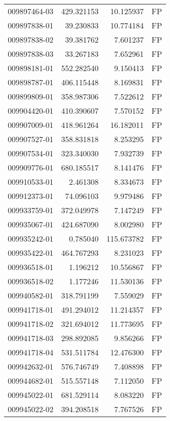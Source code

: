 \begin{tabular}{lrrl}
009897464-03 &  429.321153 &    10.125937 &   FP \\
009897838-01 &   39.230833 &    10.774184 &   FP \\
009897838-02 &   39.381762 &     7.601237 &   FP \\
009897838-03 &   33.267183 &     7.652961 &   FP \\
009898181-01 &  552.282540 &     9.150413 &   FP \\
009898787-01 &  406.115448 &     8.169831 &   FP \\
009899809-01 &  358.987306 &     7.522612 &   FP \\
009904420-01 &  410.390607 &     7.570152 &   FP \\
009907009-01 &  418.961264 &    16.182011 &   FP \\
009907527-01 &  358.831818 &     8.253295 &   FP \\
009907534-01 &  323.340030 &     7.932739 &   FP \\
009909776-01 &  680.185517 &     8.141476 &   FP \\
009910533-01 &    2.461308 &     8.334673 &   FP \\
009912373-01 &   74.096103 &     9.979486 &   FP \\
009933759-01 &  372.049978 &     7.147249 &   FP \\
009935067-01 &  424.687090 &     8.002980 &   FP \\
009935242-01 &    0.785040 &   115.673782 &   FP \\
009935422-01 &  464.767293 &     8.231023 &   FP \\
009936518-01 &    1.196212 &    10.556867 &   FP \\
009936518-02 &    1.177246 &    11.530136 &   FP \\
009940582-01 &  318.791199 &     7.559029 &   FP \\
009941718-01 &  491.294012 &    11.214357 &   FP \\
009941718-02 &  321.694012 &    11.773695 &   FP \\
009941718-03 &  298.892085 &     9.856266 &   FP \\
009941718-04 &  531.511784 &    12.476300 &   FP \\
009942632-01 &  576.746749 &     7.408898 &   FP \\
009944682-01 &  515.557148 &     7.112050 &   FP \\
009945022-01 &  681.529114 &     8.083220 &   FP \\
009945022-02 &  394.208518 &     7.767526 &   FP \\

\end{tabular}
